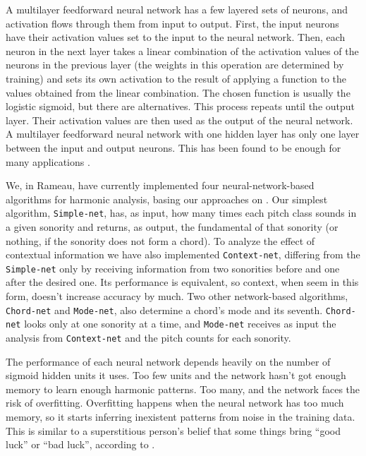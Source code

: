 \documentclass{article}
\begin{document}
A multilayer feedforward neural network has a few layered sets of
neurons, and activation flows through them from input to
output. First, the input neurons have their activation values set to
the input to the neural network. Then, each neuron in the next layer
takes a linear combination of the activation values of the neurons in
the previous layer (the weights in this operation are determined by
training) and sets its own activation to the result of applying a
function to the values obtained from the linear combination. The
chosen function is usually the logistic sigmoid, but there are
alternatives. This process repeats until the output layer. Their
activation values are then used as the output of the neural network. A
multilayer feedforward neural network with one hidden layer has only
one layer between the input and output neurons. This has been found to
be enough for many applications
\cite{russell02:aima}.

We, in Rameau, have currently implemented four neural-network-based
algorithms for harmonic analysis, basing our approaches on
\cite{tsui02:_harmon_analy_using_neural_networ}. Our simplest
algorithm, \texttt{Simple-net}, has, as input, how many times each
pitch class sounds in a given sonority and returns, as output, the
fundamental of that sonority (or nothing, if the sonority does not
form a chord). To analyze the effect of contextual information we have
also implemented \texttt{Context-net}, differing from the
\texttt{Simple-net} only by receiving information from two sonorities
before and one after the desired one. Its performance is equivalent,
so context, when seem in this form, doesn't increase accuracy by
much. Two other network-based algorithms, \texttt{Chord-net} and
\texttt{Mode-net}, also determine a chord's mode and its
seventh. \texttt{Chord-net} looks only at one sonority at a time, and
\texttt{Mode-net} receives as input the analysis from
\texttt{Context-net} and the pitch counts for each sonority.

The performance of each neural network depends heavily on the number
of sigmoid hidden units it uses. Too few units and the network hasn't
got enough memory to learn enough harmonic patterns. Too many, and the
network faces the risk of overfitting. Overfitting happens when the
neural network has too much memory, so it starts inferring inexistent
patterns from noise in the training data. This is similar to a
superstitious person's belief that some things bring ``good luck'' or
``bad luck'', according to \cite{white95:superstitious}.
\end{document}
